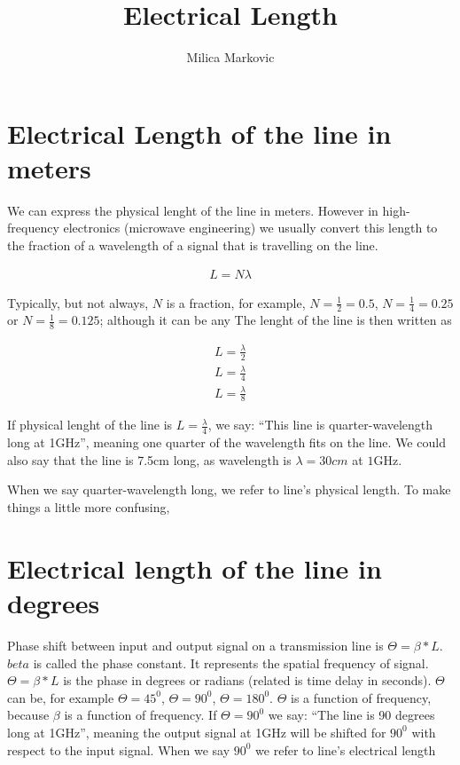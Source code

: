 \documentclass{ximera}
\title{Electrical Length}
\author{Milica Markovic}
\begin{document}
  
\begin{abstract}  

\end{abstract}  
\maketitle    





\section{Electrical Length of the line in meters}

We can express the physical lenght of the line in meters. However in high-frequency electronics (microwave engineering) we usually convert this length to the fraction of a wavelength of a signal that is travelling on the line. 


\begin{eqnarray}
 L=N \lambda
\end{eqnarray}
 

Typically, but not always, $N$ is a fraction, for example,  $N=\frac{1}{2}=0.5$, $N=\frac{1}{4}=0.25$ or $N=\frac{1}{8}=0.125$; although it can be any  The lenght of the line is then written as


\begin{eqnarray}
 L=\frac{\lambda}{2}  \\
 L=\frac{\lambda}{4}  \\
  L=\frac{\lambda}{8}  
\end{eqnarray}
 


If physical lenght of the line is $L=\frac{\lambda}{4}$, we say: “This line is quarter-wavelength long at 1GHz”, meaning one quarter of the wavelength fits on the line. We could also say that the line is 7.5cm long, as wavelength is $\lambda=30 \unit{cm}$ at $1$GHz.


When we say quarter-wavelength long, we refer to line’s physical length. To make things a little more confusing,

\section{Electrical length of the line in degrees}

Phase shift between input and output signal on a transmission line is  
$\Theta=\beta*L$.
$beta$ is called the phase constant. It represents the spatial frequency of signal.
$\Theta=\beta*L$ is the phase in degrees or radians (related is time delay in seconds).
$\Theta$  can be, for example $\Theta = 45^0$, $\Theta = 90^0$, $\Theta = 180^0$. $\Theta$ is a function of frequency, because $\beta$ is a function of frequency.
 If $\Theta = 90^0$ we say: “The line is 90 degrees long at 1GHz”, meaning the output signal at 1GHz will be shifted for $90^0$ with respect to the input signal. 
When we say $90^0$ we refer to line’s electrical length
\end{document}
